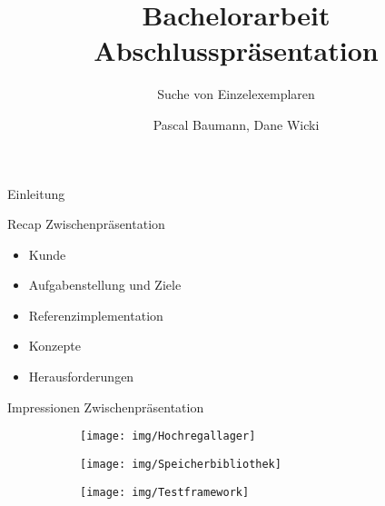 \documentclass{beamer}
\title{Bachelorarbeit\\ Abschlusspräsentation}
\subtitle{Suche von Einzelexemplaren}
\author{Pascal Baumann, Dane Wicki}
\begin{document}
\begin{frame}[plain]
    \maketitle
\end{frame}
\begin{frame}{Einleitung}
\end{frame}
\begin{frame}{Recap Zwischenpräsentation}
\begin{itemize}
    \item Kunde
    \item Aufgabenstellung und Ziele
    \item Referenzimplementation
    \item Konzepte
    \item Herausforderungen
\end{itemize}
\end{frame}
\begin{frame}{Impressionen Zwischenpräsentation}
\begin{figure}
    \centering
    \begin{subfigure}{0.45\linewidth}
        \texttt{[image: img/Hochregallager]}
    \end{subfigure}
    \begin{subfigure}{0.45\linewidth}
        \texttt{[image: img/Speicherbibliothek]}
    \end{subfigure}
    \vspace{5em}
    \begin{subfigure}{0.7\linewidth}
        \texttt{[image: img/Testframework]}
    \end{subfigure}
\end{figure}
\end{frame}
\end{document}
